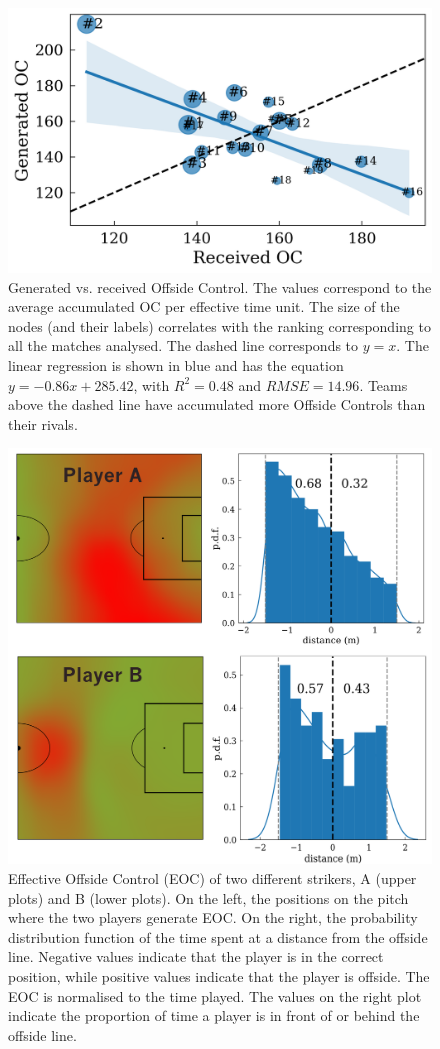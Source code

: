 \documentclass[
  10pt,
  twoside,nohyper]{book}
\begin{document}
\begin{figure}[H]

{\centering \includegraphics[width=0.8\linewidth,]{imagenes/Mean_rival_OC_vs_team_norm_efftime} 

}

\caption{Generated vs. received Offside Control. The values correspond to the average accumulated OC per effective time unit. The size of the nodes (and their labels) correlates with the ranking corresponding to all the matches analysed. The dashed line corresponds to $y=x$. The linear regression is shown in blue and has the equation $y = -0.86x + 285.42$, with $R^2 = 0.48$ and $RMSE = 14.96$. Teams above the dashed line have accumulated more Offside Controls than their rivals.}\label{fig:ranking}
\end{figure}

\begin{figure}[H]

{\centering \includegraphics[width=0.7\linewidth,]{imagenes/forwards_OC} 

}

\caption{Effective Offside Control (EOC) of two different strikers, A (upper plots) and B (lower plots). On the left, the positions on the pitch where the two players generate EOC. On the right, the probability distribution function of the time spent at a distance from the offside line. Negative values indicate that the player is in the correct position, while positive values indicate that the player is offside. The EOC is normalised to the time played. The values on the right plot indicate the proportion of time a player is in front of or behind the offside line.}\label{fig:forwards}
\end{figure}
\end{document}
